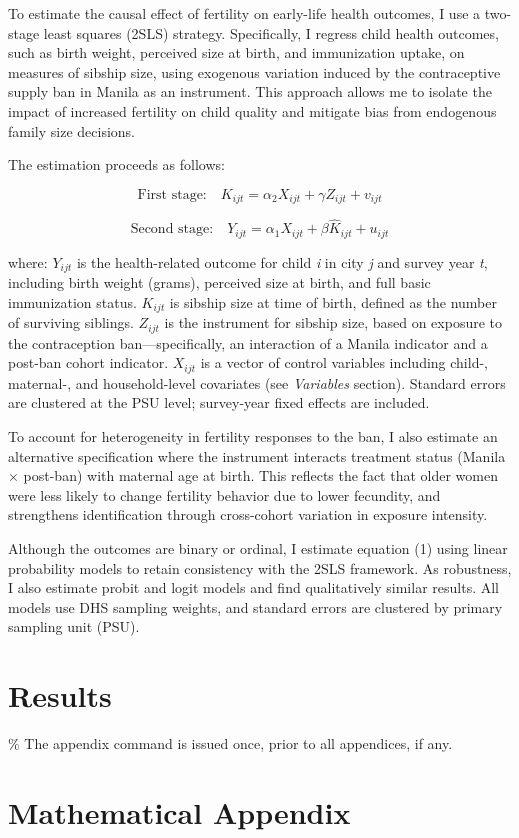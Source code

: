 \documentclass[]{AEA}
\begin{document}
To estimate the causal effect of fertility on early-life health
outcomes, I use a two-stage least squares (2SLS) strategy. Specifically,
I regress child health outcomes, such as birth weight, perceived size at
birth, and immunization uptake, on measures of sibship size, using
exogenous variation induced by the contraceptive supply ban in Manila as
an instrument. This approach allows me to isolate the impact of
increased fertility on child quality and mitigate bias from endogenous
family size decisions.

The estimation proceeds as follows:

\[
\text{First stage:} \quad K_{ijt} = \alpha_2 X_{ijt} + \gamma Z_{ijt} + v_{ijt}
\]

\[
\text{Second stage:} \quad Y_{ijt} = \alpha_1 X_{ijt} + \beta \widehat{K}_{ijt} + u_{ijt}
\]

where: \(Y_{ijt}\) is the health-related outcome for child \emph{i} in
city \emph{j} and survey year \emph{t}, including birth weight (grams),
perceived size at birth, and full basic immunization status. \(K_{ijt}\)
is sibship size at time of birth, defined as the number of surviving
siblings. \(Z_{ijt}\) is the instrument for sibship size, based on
exposure to the contraception ban---specifically, an interaction of a
Manila indicator and a post-ban cohort indicator. \(X_{ijt}\) is a
vector of control variables including child-, maternal-, and
household-level covariates (see \emph{Variables} section). Standard
errors are clustered at the PSU level; survey-year fixed effects are
included.

To account for heterogeneity in fertility responses to the ban, I also
estimate an alternative specification where the instrument interacts
treatment status (Manila × post-ban) with maternal age at birth. This
reflects the fact that older women were less likely to change fertility
behavior due to lower fecundity, and strengthens identification through
cross-cohort variation in exposure intensity.

Although the outcomes are binary or ordinal, I estimate equation (1)
using linear probability models to retain consistency with the 2SLS
framework. As robustness, I also estimate probit and logit models and
find qualitatively similar results. All models use DHS sampling weights,
and standard errors are clustered by primary sampling unit (PSU).

\section{Results}




\% The appendix command is issued once, prior to all appendices, if any.
\appendix

\section{Mathematical Appendix}
\end{document}
